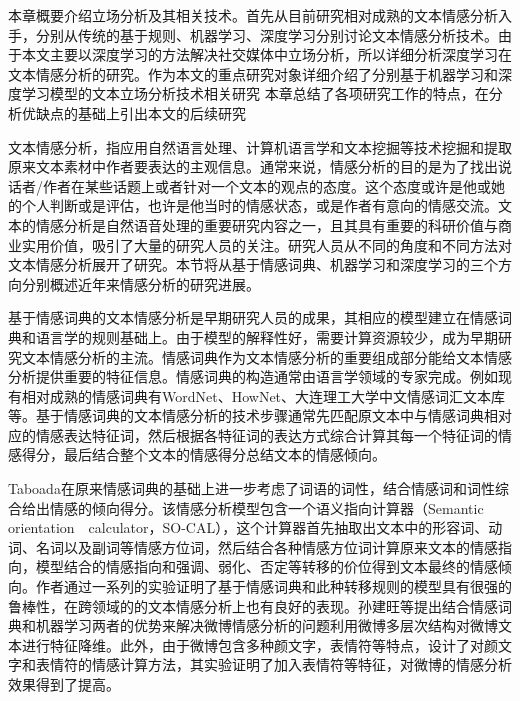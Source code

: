 

本章概要介绍立场分析及其相关技术。首先从目前研究相对成熟的文本情感分析入手，分别从传统的基于规则、机器学习、深度学习分别讨论文本情感分析技术。由于本文主要以深度学习的方法解决社交媒体中立场分析，所以详细分析深度学习在文本情感分析的研究。作为本文的重点研究对象详细介绍了分别基于机器学习和深度学习模型的文本立场分析技术相关研究 本章总结了各项研究工作的特点，在分析优缺点的基础上引出本文的后续研究



文本情感分析，指应用自然语言处理、计算机语言学和文本挖掘等技术挖掘和提取原来文本素材中作者要表达的主观信息。通常来说，情感分析的目的是为了找出说话者/作者在某些话题上或者针对一个文本的观点的态度。这个态度或许是他或她的个人判断或是评估，也许是他当时的情感状态，或是作者有意向的情感交流。文本的情感分析是自然语音处理的重要研究内容之一，且其具有重要的科研价值与商业实用价值，吸引了大量的研究人员的关注。研究人员从不同的角度和不同方法对文本情感分析展开了研究。本节将从基于情感词典、机器学习和深度学习的三个方向分别概述近年来情感分析的研究进展。


基于情感词典的文本情感分析是早期研究人员的成果，其相应的模型建立在情感词典和语言学的规则基础上。由于模型的解释性好，需要计算资源较少，成为早期研究文本情感分析的主流。情感词典作为文本情感分析的重要组成部分能给文本情感分析提供重要的特征信息。情感词典的构造通常由语言学领域的专家完成。例如现有相对成熟的情感词典有WordNet、HowNet、大连理工大学中文情感词汇文本库等。基于情感词典的文本情感分析的技术步骤通常先匹配原文本中与情感词典相对应的情感表达特征词，然后根据各特征词的表达方式综合计算其每一个特征词的情感得分，最后结合整个文本的情感得分总结文本的情感倾向。

Taboada在原来情感词典的基础上进一步考虑了词语的词性，结合情感词和词性综合给出情感的倾向得分。该情感分析模型包含一个语义指向计算器（Semantic　orientation　calculator，SO-CAL），这个计算器首先抽取出文本中的形容词、动词、名词以及副词等情感方位词，然后结合各种情感方位词计算原来文本的情感指向，模型结合的情感指向和强调、弱化、否定等转移的价位得到文本最终的情感倾向。作者通过一系列的实验证明了基于情感词典和此种转移规则的模型具有很强的鲁棒性，在跨领域的的文本情感分析上也有良好的表现。孙建旺等提出结合情感词典和机器学习两者的优势来解决微博情感分析的问题利用微博多层次结构对微博文本进行特征降维。此外，由于微博包含多种颜文字，表情符等特点，设计了对颜文字和表情符的情感计算方法，其实验证明了加入表情符等特征，对微博的情感分析效果得到了提高。

